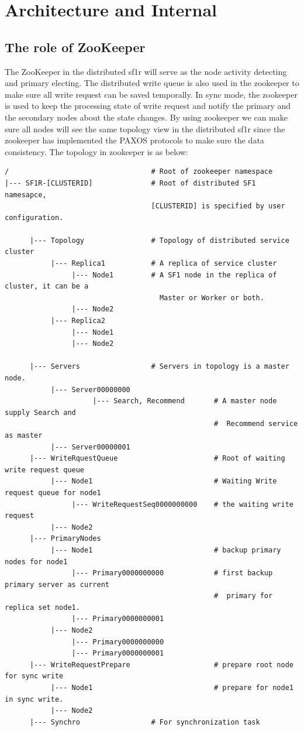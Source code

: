 \section{Architecture and Internal}
\subsection{The role of ZooKeeper}
    The ZooKeeper in the distributed sf1r will serve as the node activity detecting and primary electing. The distributed write queue is also used in the zookeeper to make sure all write request can be saved temporally. In sync mode, the zookeeper is used to keep the processing state of write request and notify the primary and the secondary nodes about the state changes. By using zookeeper we can make sure all nodes  will see the same topology view in the distributed sf1r since the zookeeper has implemented the PAXOS protocols to make sure the data consistency. The topology in zookeeper is as below:
\begin{lstlisting}
/                                  # Root of zookeeper namespace
|--- SF1R-[CLUSTERID]              # Root of distributed SF1 namesapce, 
                                   [CLUSTERID] is specified by user configuration.

      |--- Topology                # Topology of distributed service cluster
           |--- Replica1           # A replica of service cluster
                |--- Node1         # A SF1 node in the replica of cluster, it can be a 
                                     Master or Worker or both.
                |--- Node2
           |--- Replica2
                |--- Node1
                |--- Node2

      |--- Servers                 # Servers in topology is a master node.
           |--- Server00000000
                     |--- Search, Recommend       # A master node supply Search and 
                                                  #  Recommend service as master
           |--- Server00000001
      |--- WriteRquestQueue                       # Root of waiting write request queue
           |--- Node1                             # Waiting Write request queue for node1
                |--- WriteRequestSeq0000000000    # the waiting write request
           |--- Node2
      |--- PrimaryNodes
           |--- Node1                             # backup primary nodes for node1 
                |--- Primary0000000000            # first backup primary server as current                                                                
                                                  #  primary for replica set node1.
                |--- Primary0000000001            
           |--- Node2
                |--- Primary0000000000
                |--- Primary0000000001
      |--- WriteRequestPrepare                    # prepare root node for sync write
           |--- Node1                             # prepare for node1 in sync write.
           |--- Node2
      |--- Synchro                 # For synchronization task

\end{lstlisting} 
    
